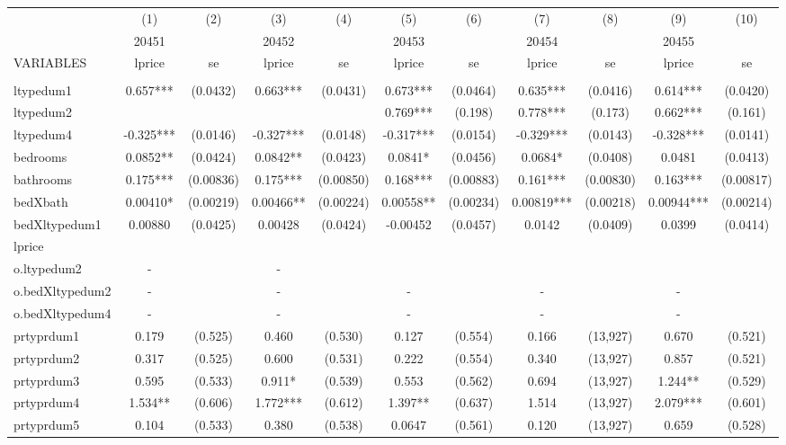\documentclass[]{article}
\begin{document}
\begin{tabular}{lcccccccccc} \hline
 & (1) & (2) & (3) & (4) & (5) & (6) & (7) & (8) & (9) & (10) \\
 & 20451 &  & 20452 &  & 20453 &  & 20454 &  & 20455 &  \\
VARIABLES & lprice & se & lprice & se & lprice & se & lprice & se & lprice & se \\ \hline
 &  &  &  &  &  &  &  &  &  &  \\
ltypedum1 & 0.657*** & (0.0432) & 0.663*** & (0.0431) & 0.673*** & (0.0464) & 0.635*** & (0.0416) & 0.614*** & (0.0420) \\
ltypedum2 &  &  &  &  & 0.769*** & (0.198) & 0.778*** & (0.173) & 0.662*** & (0.161) \\
ltypedum4 & -0.325*** & (0.0146) & -0.327*** & (0.0148) & -0.317*** & (0.0154) & -0.329*** & (0.0143) & -0.328*** & (0.0141) \\
bedrooms & 0.0852** & (0.0424) & 0.0842** & (0.0423) & 0.0841* & (0.0456) & 0.0684* & (0.0408) & 0.0481 & (0.0413) \\
bathrooms & 0.175*** & (0.00836) & 0.175*** & (0.00850) & 0.168*** & (0.00883) & 0.161*** & (0.00830) & 0.163*** & (0.00817) \\
bedXbath & 0.00410* & (0.00219) & 0.00466** & (0.00224) & 0.00558** & (0.00234) & 0.00819*** & (0.00218) & 0.00944*** & (0.00214) \\
bedXltypedum1 & 0.00880 & (0.0425) & 0.00428 & (0.0424) & -0.00452 & (0.0457) & 0.0142 & (0.0409) & 0.0399 & (0.0414) \\
lprice &  &  &  &  &  &  &  &  &  &  \\
o.ltypedum2 & - &  & - &  &  &  &  &  &  &  \\
o.bedXltypedum2 & - &  & - &  & - &  & - &  & - &  \\
o.bedXltypedum4 & - &  & - &  & - &  & - &  & - &  \\
prtyprdum1 & 0.179 & (0.525) & 0.460 & (0.530) & 0.127 & (0.554) & 0.166 & (13,927) & 0.670 & (0.521) \\
prtyprdum2 & 0.317 & (0.525) & 0.600 & (0.531) & 0.222 & (0.554) & 0.340 & (13,927) & 0.857 & (0.521) \\
prtyprdum3 & 0.595 & (0.533) & 0.911* & (0.539) & 0.553 & (0.562) & 0.694 & (13,927) & 1.244** & (0.529) \\
prtyprdum4 & 1.534** & (0.606) & 1.772*** & (0.612) & 1.397** & (0.637) & 1.514 & (13,927) & 2.079*** & (0.601) \\
prtyprdum5 & 0.104 & (0.533) & 0.380 & (0.538) & 0.0647 & (0.561) & 0.120 & (13,927) & 0.659 & (0.528) \\

\end{tabular}
\end{document}
